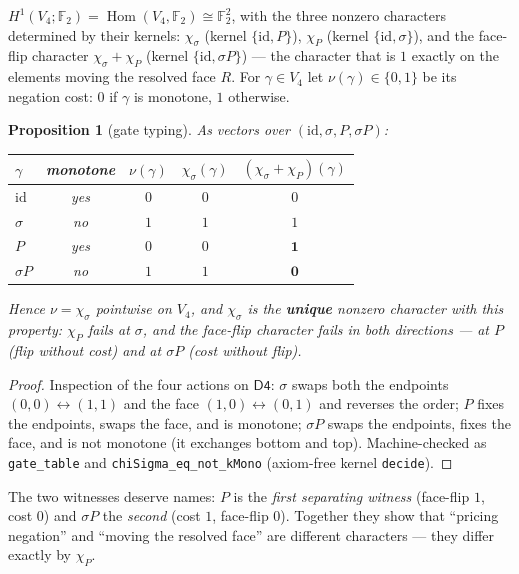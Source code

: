 \documentclass[11pt]{article}
\newtheorem{proposition}[theorem]{Proposition}
\theoremstyle{remark}
\newcommand{\F}{\mathbb{F}}
\newcommand{\Dfour}{\mathsf{D4}}
\newcommand{\chis}{\chi_\sigma}
\newcommand{\chip}{\chi_P}
\begin{document}
$H^1(V_4;\F_2)=\operatorname{Hom}(V_4,\F_2)\cong\F_2^2$, with the three
nonzero characters determined by their kernels: $\chis$ (kernel
$\{\mathrm{id},P\}$), $\chip$ (kernel $\{\mathrm{id},\sigma\}$), and the
face-flip character $\chis+\chip$ (kernel $\{\mathrm{id},\sigma P\}$) ---
the character that is $1$ exactly on the elements moving the resolved face
$R$. For $\gamma\in V_4$ let $\nu(\gamma)\in\{0,1\}$ be its negation cost:
$0$ if $\gamma$ is monotone, $1$ otherwise.

\begin{proposition}[gate typing]\label{prop:gate}
As vectors over $(\mathrm{id},\sigma,P,\sigma P)$:
\begin{center}
\begin{tabular}{lcccc}
\toprule
$\gamma$ & monotone & $\nu(\gamma)$ & $\chis(\gamma)$ & $(\chis+\chip)(\gamma)$\\
\midrule
$\mathrm{id}$ & yes & $0$ & $0$ & $0$\\
$\sigma$      & no  & $1$ & $1$ & $1$\\
$P$           & yes & $0$ & $0$ & $\mathbf{1}$\\
$\sigma P$    & no  & $1$ & $1$ & $\mathbf{0}$\\
\bottomrule
\end{tabular}
\end{center}
Hence $\nu=\chis$ pointwise on $V_4$, and $\chis$ is the \textbf{unique}
nonzero character with this property: $\chip$ fails at $\sigma$, and the
face-flip character fails in both directions --- at $P$ (flip without cost)
and at $\sigma P$ (cost without flip).
\end{proposition}

\begin{proof}
Inspection of the four actions on $\Dfour$: $\sigma$ swaps both the
endpoints $(0,0)\leftrightarrow(1,1)$ and the face
$(1,0)\leftrightarrow(0,1)$ and reverses the order; $P$ fixes the endpoints,
swaps the face, and is monotone; $\sigma P$ swaps the endpoints, fixes the
face, and is not monotone (it exchanges bottom and top). Machine-checked as
\texttt{gate\_table} and \texttt{chiSigma\_eq\_not\_kMono} (axiom-free
kernel \texttt{decide}).
\end{proof}

The two witnesses deserve names: $P$ is the \emph{first separating witness}
(face-flip $1$, cost $0$) and $\sigma P$ the \emph{second} (cost $1$,
face-flip $0$). Together they show that ``pricing negation'' and ``moving
the resolved face'' are different characters --- they differ exactly by
$\chip$.
\end{document}
